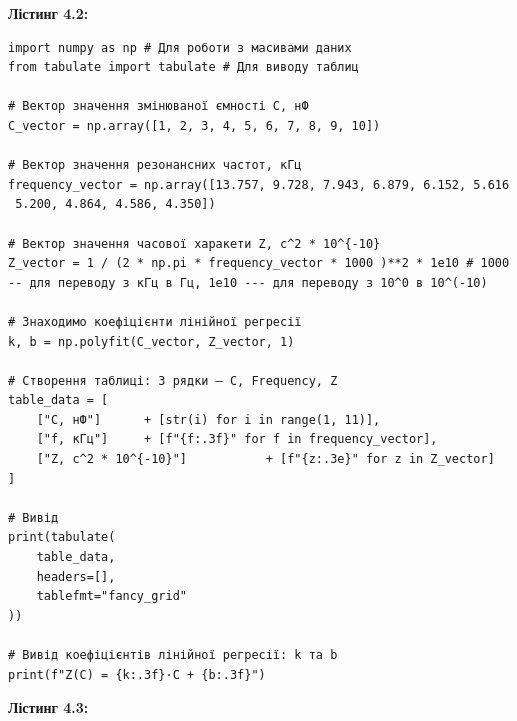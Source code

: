 \documentclass[12pt, a4paper]{article}
\begin{document}
    \textbf{\large Лістинг 4.2:}

    \vspace{1em}

    \small{

    \begin{verbatim}
import numpy as np # Для роботи з масивами даних
from tabulate import tabulate # Для виводу таблиц

# Вектор значення змінюваної ємності C, нФ
C_vector = np.array([1, 2, 3, 4, 5, 6, 7, 8, 9, 10])

# Вектор значення резонансних частот, кГц
frequency_vector = np.array([13.757, 9.728, 7.943, 6.879, 6.152, 5.616
 5.200, 4.864, 4.586, 4.350])

# Вектор значення часової харакети Z, с^2 * 10^{-10}
Z_vector = 1 / (2 * np.pi * frequency_vector * 1000 )**2 * 1e10 # 1000
-- для переводу з кГц в Гц, 1e10 --- для переводу з 10^0 в 10^(-10)

# Знаходимо коефіцієнти лінійної регресії
k, b = np.polyfit(C_vector, Z_vector, 1)

# Створення таблиці: 3 рядки — C, Frequency, Z
table_data = [
    ["C, нФ"]      + [str(i) for i in range(1, 11)],
    ["f, кГц"]     + [f"{f:.3f}" for f in frequency_vector],
    ["Z, с^2 * 10^{-10}"]           + [f"{z:.3e}" for z in Z_vector]
]

# Вивід
print(tabulate(
    table_data,
    headers=[],
    tablefmt="fancy_grid"
))

# Вивід коефіцієнтів лінійної регресії: k та b
print(f"Z(C) = {k:.3f}·C + {b:.3f}")
\end{verbatim}
}

    \vspace{3em}

    \hypertarget{listing3}{}

    \textbf{\large Лістинг 4.3:}

    \vspace{1em}
\end{document}
